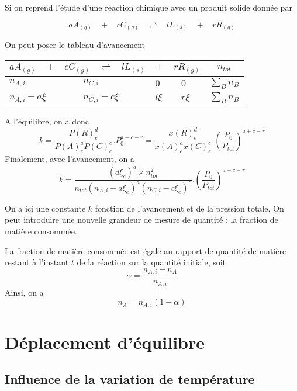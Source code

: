 Si on reprend l'étude d'une réaction chimique avec un produit solide donnée par 

$$aA_{(g)}~~~~+~~~~cC_{(g)}~~~~\rightleftharpoons~~~~ lL_{(s)}~~~~+~~~~rR_{(g)}$$

On peut poser le tableau d'avancement\\
\begin{table}[H]
\centering
\begin{tabular}{|p{1.5cm}|p{1.5cm}|p{1.5cm}|p{1.5cm}|c|}
\hline
\multicolumn{4}{|c|}{$aA_{(g)}~~~~+~~~~cC_{(g)}~~~~\rightleftharpoons~~~~ lL_{(s)}~~~~+~~~~rR_{(g)}$}&$n_{tot}$\\
\hline
$n_{A,i}$&$n_{C,i}$&$0$&$0$&$\sum_B n_B$\\
\hline
$n_{A,i}-a\xi$&$n_{C,i}-c\xi$&$l\xi$&$r\xi$&$\sum_B n_B$\\
\hline
\end{tabular}
\end{table}

A l'équilibre, on a donc 
$$k=\frac{P(R)_e^d}{P(A)_e^aP(C)_e^c}.P_0^{a+c-r} = \frac{x(R)_e^d}{x(A)_e^ax(C)_e^c}.\left (\frac{P_0}{P_{tot}}\right )^{a+c-r}$$
Finalement, avec l'avancement, on a 
\begin{equation}
k=\frac{(d\xi_e)^d\times n_{tot}^2}{n_{tot}(n_{A,i}-a\xi_e)^a(n_{C,i}-c\xi_e)^c}.\left (\frac{P_0}{P_{tot}}\right )^{a+c-r}
\end{equation}

On  a ici une constante $k$ fonction de l'avancement et de la pression totale. On peut introduire une nouvelle grandeur de mesure de quantité : la fraction de matière consommée.

\begin{definition}
La fraction de matière consommée est égale au rapport de quantité de matière restant à l'instant $t$ de la réaction sur la quantité initiale, soit
\begin{equation}
\alpha = \frac{n_{A,i}-n_A}{n_{A,i}}
\end{equation}
Ainsi, on a 
\begin{equation}
n_A=n_{A,i}(1-\alpha)
\end{equation}
\end{definition}

\section{Déplacement d'équilibre}

\subsection{Influence de la variation de température}

